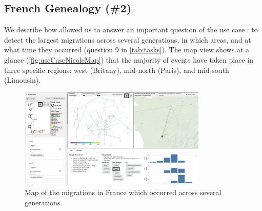 


\subsection{French Genealogy (\#2)}

We describe how \name allowed us to answer an important question of the use case \nicole: to detect the largest migrations across several generations, in which areas, and at what time they occurred (question 9 in \autoref{tab:tasks}).
The map view shows at a glance (\autoref{fig:useCaseNicoleMap}) that the majority of events have taken place in three specific regions: west (Britany), mid-north (Paris), and mid-south (Limousin).

\begin{figure}[!ht]
    \centering
    \includegraphics[trim={82cmcm 30cm 0 0},clip,width=0.8\textwidth]{static/figures/ComBiNet/OriginalPaperFigures/suppMaterial/FrenchGenealogy}
    \caption{Map of the migrations in France which occurred across several generations.}\label{fig:useCaseNicoleMap}
\end{figure}

